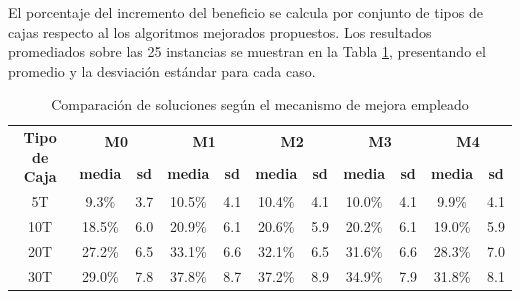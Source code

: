 \documentclass[openany]{article}
\begin{document}
El porcentaje del incremento del beneficio se calcula por conjunto de tipos de cajas respecto al los algoritmos mejorados propuestos. Los resultados promediados sobre las 25 instancias se muestran en la Tabla \ref{tab:valor_aportado}, presentando el promedio y la desviación estándar para cada caso.

\begin{table}[H]
    \centering
    \caption{Comparación de soluciones según el mecanismo de mejora empleado}
    \label{tab:valor_aportado}
    \begin{tabular}{|c|c|c|c|c|c|c|c|c|c|c|}
        \hline
        \multirow{2}{*}{\textbf{Tipo de Caja}} & \multicolumn{2}{c|}{\textbf{M0}} & \multicolumn{2}{c|}{\textbf{M1}} & \multicolumn{2}{c|}{\textbf{M2}} & \multicolumn{2}{c|}{\textbf{M3}} & \multicolumn{2}{c|}{\textbf{M4}}                                                                             \\ \cline{2-11}
                                               & \textbf{media}                   & \textbf{sd}                      & \textbf{media}                   & \textbf{sd}                      & \textbf{media}                   & \textbf{sd} & \textbf{media} & \textbf{sd} & \textbf{media} & \textbf{sd} \\ \hline
        5T                                     & 9.3\%                            & 3.7                              & 10.5\%                           & 4.1                              & 10.4\%                           & 4.1         & 10.0\%         & 4.1         & 9.9\%          & 4.1         \\ \hline
        10T                                    & 18.5\%                           & 6.0                              & 20.9\%                           & 6.1                              & 20.6\%                           & 5.9         & 20.2\%         & 6.1         & 19.0\%         & 5.9         \\ \hline
        20T                                    & 27.2\%                           & 6.5                              & 33.1\%                           & 6.6                              & 32.1\%                           & 6.5         & 31.6\%         & 6.6         & 28.3\%         & 7.0         \\ \hline
        30T                                    & 29.0\%                           & 7.8                              & 37.8\%                           & 8.7                              & 37.2\%                           & 8.9         & 34.9\%         & 7.9         & 31.8\%         & 8.1         \\ \hline

\end{tabular}
\end{table}
\end{document}
